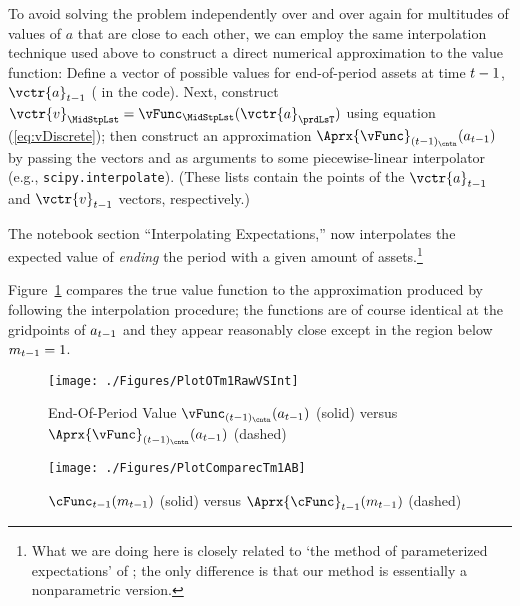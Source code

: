 To avoid solving the problem independently over and over again for multitudes of values of ${a}$ that are close to each other, we can employ the same interpolation technique used above to construct a direct numerical approximation to the value function: Define a vector of possible values for end-of-period assets at time $t-1$, $\vctr{{a}}_{\prdT-1}$ ( in the code). Next, construct $\vctr{{v}}_{\MidStpLst} = \vFunc_{\MidStpLst}(\vctr{{a}}_{\prdLsT})$ using equation (\ref{eq:vDiscrete}); then construct an approximation $\Aprx{\vFunc}_{({\prdT-1})_\cntn}({a}_{\prdT-1})$ by passing the vectors {\aVec} and {\vVec} as arguments to some piecewise-linear interpolator (e.g., \texttt{scipy.interpolate}).  (These lists contain the points of the $\vctr{a}_{{\prdT-1}}$ and $\vctr{{v}}_{{\prdT-1}}$ vectors, respectively.)

The notebook section ``Interpolating Expectations,'' now interpolates the expected value of \textit{ending} the period with a given amount of assets.\footnote{What we are doing here is closely related to `the method of parameterized expectations' of \cite{denHaanMarcet:parameterized}; the only difference is that our method is essentially a nonparametric version.}  %

Figure~\ref{fig:PlotOTm1RawVSInt} compares the true value function to the approximation produced by following the interpolation procedure; the functions are of course identical at the gridpoints of ${a}_{t-1}$ and they appear reasonably close except in the region below ${m}_{t-1}=1$.

\hypertarget{PlotOTm1RawVSInt}{}
\begin{figure}
  \centerline{\texttt{[image: ./Figures/PlotOTm1RawVSInt]}}
  \caption{End-Of-Period Value $\vFunc_{({\prdT-1})_\cntn}({a}_{\prdT-1})$ (solid) versus $\Aprx{\vFunc}_{({\prdT-1})_\cntn}({a}_{\prdT-1})$ (dashed)}
  \label{fig:PlotOTm1RawVSInt}
\end{figure}

\hypertarget{PlotComparecTm1AB}{}
\begin{figure}
  \centerline{\texttt{[image: ./Figures/PlotComparecTm1AB]}}
  \caption{$\cFunc_{\prdT-1}({m}_{\prdT-1})$ (solid) versus $\Aprx{\cFunc}_{\prdT-1}({m}_{\prdT-1})$ (dashed)}
  \label{fig:PlotComparecTm1AB}
\end{figure}



